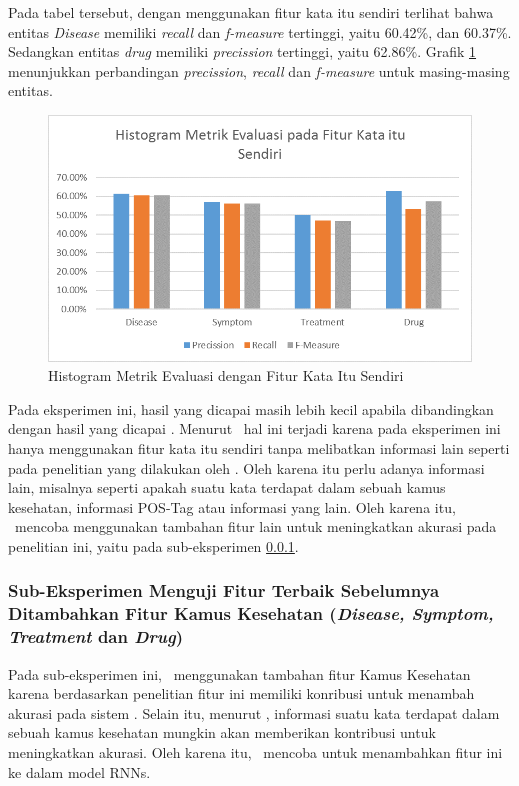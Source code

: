 	Pada tabel tersebut, dengan menggunakan fitur kata itu sendiri terlihat bahwa entitas \textit{Disease} memiliki \textit{recall} dan \textit{f-measure} tertinggi, yaitu 60.42\%, dan 60.37\%. Sedangkan entitas \textit{drug} memiliki \textit{precission} tertinggi, yaitu 62.86\%. Grafik \ref{fig:own1} menunjukkan perbandingan \textit{precission}, \textit{recall} dan \textit{f-measure} untuk masing-masing entitas.
	
	\begin{figure}
	  \centering
	  \includegraphics[width=0.85\linewidth]{images/histogram00}
	  \caption{Histogram Metrik Evaluasi dengan Fitur Kata Itu Sendiri}
	  \label{fig:own1}
	\end{figure}

	Pada eksperimen ini, hasil yang dicapai masih lebih kecil apabila dibandingkan dengan hasil yang dicapai \cite{skripsiKakRadit}. Menurut \saya~hal ini terjadi karena pada eksperimen ini hanya menggunakan fitur kata itu sendiri tanpa melibatkan informasi lain seperti pada penelitian yang dilakukan oleh \cite{skripsiKakRadit}. Oleh karena itu perlu adanya informasi lain, misalnya seperti apakah suatu kata terdapat dalam sebuah kamus kesehatan, informasi POS-Tag atau informasi yang lain. Oleh karena itu, \saya~mencoba menggunakan tambahan fitur lain untuk meningkatkan akurasi pada penelitian ini, yaitu pada sub-eksperimen \ref{eks:subeksdict}.
	
	\subsubsection{Sub-Eksperimen Menguji Fitur Terbaik Sebelumnya Ditambahkan Fitur Kamus Kesehatan (\textit{Disease, Symptom, Treatment} dan \textit{Drug})}\label{eks:subeksdict}
	Pada sub-eksperimen ini, \saya~menggunakan tambahan fitur Kamus Kesehatan karena berdasarkan penelitian \cite{skripsiKakRadit} fitur ini memiliki konribusi untuk menambah akurasi pada sistem \mer. Selain itu, menurut \saya, informasi suatu kata terdapat dalam sebuah kamus kesehatan mungkin akan memberikan kontribusi untuk meningkatkan akurasi. Oleh karena itu, \saya~mencoba untuk menambahkan fitur ini ke dalam model RNNs.
	
